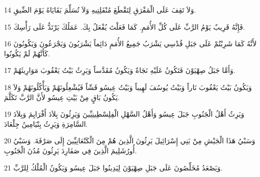 \par 14 وَلاَ تَقِفَ عَلَى الْمَفْرَقِ لِتَقْطَعَ مُنْفَلِتِيهِ وَلاَ تُسَلِّمَ بَقَايَاهُ يَوْمَ الضِّيقِ.
\par 15 فَإِنَّهُ قَرِيبٌ يَوْمُ الرَّبِّ عَلَى كُلِّ الأُمَمِ. كَمَا فَعَلْتَ يُفْعَلُ بِكَ. عَمَلُكَ يَرْتَدُّ عَلَى رَأْسِكَ.
\par 16 لأَنَّهُ كَمَا شَرِبْتُمْ عَلَى جَبَلِ قُدْسِي يَشْرَبُ جَمِيعُ الأُمَمِ دَائِماً يَشْرَبُونَ وَيَجْرَعُونَ وَيَكُونُونَ كَأَنَّهُمْ لَمْ يَكُونُوا.
\par 17 وَأَمَّا جَبَلُ صِهْيَوْنَ فَتَكُونُ عَلَيْهِ نَجَاةٌ وَيَكُونُ مُقَدَّساً وَيَرِثُ بَيْتُ يَعْقُوبَ مَوَارِيثَهُمْ.
\par 18 وَيَكُونُ بَيْتُ يَعْقُوبَ نَاراً وَبَيْتُ يُوسُفَ لَهِيباً وَبَيْتُ عِيسُو قَشّاً فَيُشْعِلُونَهُمْ وَيَأْكُلُونَهُمْ وَلاَ يَكُونُ بَاقٍ مِنْ بَيْتِ عِيسُو لأَنَّ الرَّبَّ تَكَلَّمَ.
\par 19 وَيَرِثُ أَهْلُ الْجَنُوبِ جَبَلَ عِيسُو وَأَهْلُ السَّهْلِ الْفِلِسْطِينِيِّينَ وَيَرِثُونَ بِلاَدَ أَفْرَايِمَ وَبِلاَدَ السَّامِرَةِ وَيَرِثُ بِنْيَامِينُ جِلْعَادَ.
\par 20 وَسَبْيُ هَذَا الْجَيْشِ مِنْ بَنِي إِسْرَائِيلَ يَرِثُونَ الَّذِينَ هُمْ مِنَ الْكَنْعَانِيِّينَ إِلَى صَرْفَةَ. وَسَبْيُ أُورُشَلِيمَ الَّذِينَ فِي صَفَارِدَ يَرِثُونَ مُدُنَ الْجَنُوبِ.
\par 21 وَيَصْعَدُ مُخَلِّصُونَ عَلَى جَبَلِ صِهْيَوْنَ لِيَدِينُوا جَبَلَ عِيسُو وَيَكُونُ الْمُلْكُ لِلرَّبِّ.


